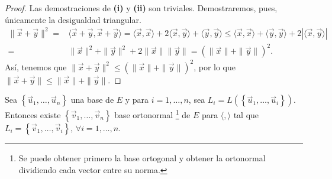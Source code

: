 \begin{proof}
Las demostraciones de \textbf{(i)} y \textbf{(ii)} son triviales. Demostraremos, pues, únicamente la desigualdad triangular. 
\[
\begin{split}
	\| \vec{x} + \vec{y}\|^{2} = & \langle \vec{x} + \vec{y}, \vec{x} +\vec{y} \rangle = \langle \vec{x}, \vec{x} \rangle + 2 \langle \vec{x}, \vec{y} \rangle + \langle \vec{y}, \vec{y} \rangle \leq \langle\vec{x}, \vec{x}\rangle + \langle \vec{y}, \vec{y} \rangle + 2 \left|\langle\vec{x}, \vec{y}\rangle \right| \\
	= & \|\vec{x}\|^{2} + \|\vec{y}\|^{2} +2\|\vec{x}\|\|\vec{y}\| = \left(\|\vec{x}\| + \|\vec{y}\|\right)^{2}.
\end{split}
\]
Así, tenemos que $\displaystyle \|\vec{x}+\vec{y}\|^{2} \leq \left(\|\vec{x}\| + \|\vec{y}\|\right)^{2} $, por lo que $\displaystyle \|\vec{x} + \vec{y}\| \leq \| \vec{x} \| + \|\vec{y}\| $.
\end{proof}
\begin{ftheorem}
	\normalfont Sea $\displaystyle \left\{ \vec{u}_{1}, \ldots, \vec{u}_{n}\right\}  $ una base de $\displaystyle E $ y para $\displaystyle i = 1, \ldots, n $, sea $\displaystyle L_{i} = L\left( \left\{ \vec{u}_{1}, \ldots, \vec{u}_{i}\right\} \right) $. Entonces existe $\displaystyle \left\{ \vec{v}_{1}, \ldots, \vec{v}_{n}\right\}  $ base ortonormal \footnote{Se puede obtener primero la base ortogonal y obtener la ortonormal dividiendo cada vector entre su norma.} de $\displaystyle E $ para $\displaystyle \langle, \rangle  $ tal que $\displaystyle L_{i} = \left\{ \vec{v}_{1}, \ldots, \vec{v}_{i}\right\}  $, $\displaystyle \forall i = 1, \ldots, n $.
\end{ftheorem}
